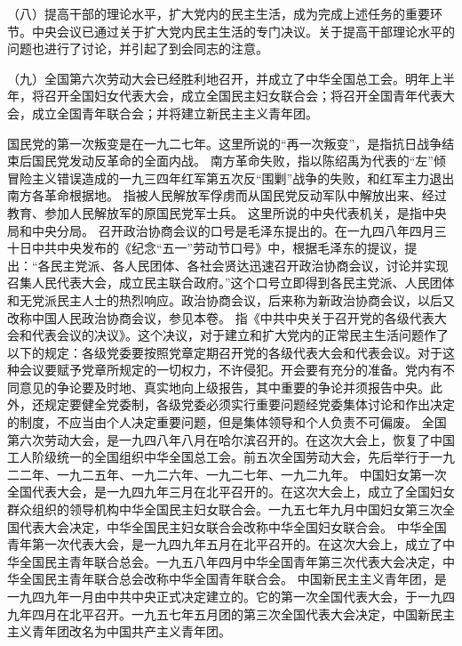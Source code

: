 （八）提高干部的理论水平，扩大党内的民主生活，成为完成上述任务的重要环节。中央会议已通过关于扩大党内民主生活的专门决议。关于提高干部理论水平的问题也进行了讨论，并引起了到会同志的注意。

（九）全国第六次劳动大会已经胜利地召开，并成立了中华全国总工会。明年上半年，将召开全国妇女代表大会，成立全国民主妇女联合会；将召开全国青年代表大会，成立全国青年联合会；并将建立新民主主义青年团。


\begin{maonote}
国民党的第一次叛变是在一九二七年。这里所说的“再一次叛变”，是指抗日战争结束后国民党发动反革命的全面内战。
南方革命失败，指以陈绍禹为代表的“左”倾冒险主义错误造成的一九三四年红军第五次反“围剿”战争的失败，和红军主力退出南方各革命根据地。
指被人民解放军俘虏而从国民党反动军队中解放出来、经过教育、参加人民解放军的原国民党军士兵。
这里所说的中央代表机关，是指中央局和中央分局。
召开政治协商会议的口号是毛泽东提出的。在一九四八年四月三十日中共中央发布的《纪念“五一”劳动节口号》中，根据毛泽东的提议，提出：“各民主党派、各人民团体、各社会贤达迅速召开政治协商会议，讨论并实现召集人民代表大会，成立民主联合政府。”这个口号立即得到各民主党派、人民团体和无党派民主人士的热烈响应。政治协商会议，后来称为新政治协商会议，以后又改称中国人民政治协商会议，参见本卷。
指《中共中央关于召开党的各级代表大会和代表会议的决议》。这个决议，对于建立和扩大党内的正常民主生活问题作了以下的规定：各级党委要按照党章定期召开党的各级代表大会和代表会议。对于这种会议要赋予党章所规定的一切权力，不许侵犯。开会要有充分的准备。党内有不同意见的争论要及时地、真实地向上级报告，其中重要的争论并须报告中央。此外，还规定要健全党委制，各级党委必须实行重要问题经党委集体讨论和作出决定的制度，不应当由个人决定重要问题，但是集体领导和个人负责不可偏废。
全国第六次劳动大会，是一九四八年八月在哈尔滨召开的。在这次大会上，恢复了中国工人阶级统一的全国组织中华全国总工会。前五次全国劳动大会，先后举行于一九二二年、一九二五年、一九二六年、一九二七年、一九二九年。
中国妇女第一次全国代表大会，是一九四九年三月在北平召开的。在这次大会上，成立了全国妇女群众组织的领导机构中华全国民主妇女联合会。一九五七年九月中国妇女第三次全国代表大会决定，中华全国民主妇女联合会改称中华全国妇女联合会。
中华全国青年第一次代表大会，是一九四九年五月在北平召开的。在这次大会上，成立了中华全国民主青年联合总会。一九五八年四月中华全国青年第三次代表大会决定，中华全国民主青年联合总会改称中华全国青年联合会。
中国新民主主义青年团，是一九四九年一月由中共中央正式决定建立的。它的第一次全国代表大会，于一九四九年四月在北平召开。一九五七年五月团的第三次全国代表大会决定，中国新民主主义青年团改名为中国共产主义青年团。
\end{maonote}
